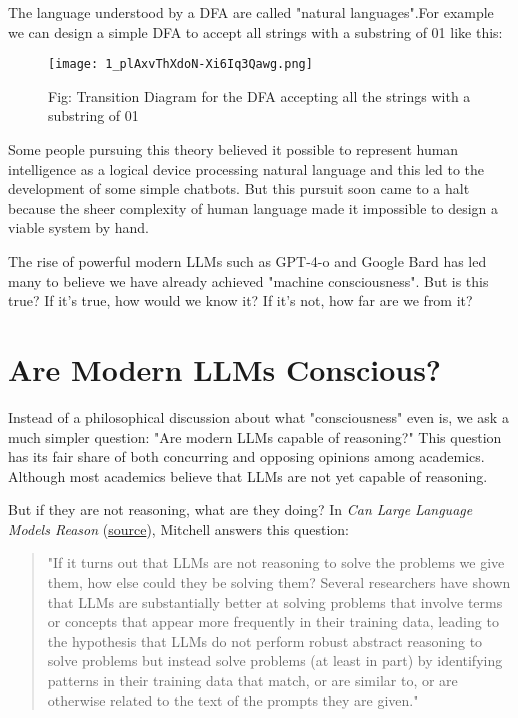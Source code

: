 The language understood by a DFA are called "natural languages".For example we can design a simple DFA to accept all strings with a substring of 01 like this:
\begin{figure}[H]
	\texttt{[image: 1\_plAxvThXdoN-Xi6Iq3Qawg.png]}
	\caption{Fig: Transition Diagram for the DFA accepting all the strings with a substring of 01}
	\label{fig:DFA}
\end{figure}

Some people pursuing this theory believed it possible to represent human intelligence as a logical device processing natural language and this led to the development of some simple chatbots. But this pursuit soon came to a halt because the sheer complexity of human language made it impossible to design a viable system by hand.


The rise of powerful modern LLMs such as GPT-4-o and Google Bard has led many to believe we have already achieved "machine consciousness". But is this true? If it's true, how would we know it? If it's not, how far are we from it?

\section*{Are Modern LLMs Conscious?}

Instead of a philosophical discussion about what "consciousness" even is, we ask a much simpler question: "Are modern LLMs capable of reasoning?" This question has its fair share of both concurring and opposing opinions among academics. Although most academics believe that LLMs are not yet capable of reasoning.

But if they are not reasoning, what are they doing? In \textit{Can Large Language Models Reason} (\href{https://aiguide.substack.com/p/can-large-language-models-reason}{source}), Mitchell answers this question:

\begin{quote}
"If it turns out that LLMs are not reasoning to solve the problems we give them, how else could they be solving them? Several researchers have shown that LLMs are substantially better at solving problems that involve terms or concepts that appear more frequently in their training data, leading to the hypothesis that LLMs do not perform robust abstract reasoning to solve problems but instead solve problems (at least in part) by identifying patterns in their training data that match, or are similar to, or are otherwise related to the text of the prompts they are given."
\end{quote}

